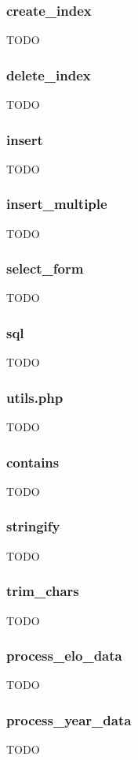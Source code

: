 \documentclass{article}
\begin{document}
\subsubsection*{create\_index}
TODO
\subsubsection*{delete\_index}
TODO
\subsubsection*{insert}
TODO
\subsubsection*{insert\_multiple}
TODO
\subsubsection*{select\_form}
TODO
\subsubsection*{sql}
TODO

\subsubsection{utils.php}
TODO

\subsubsection*{contains}
TODO

\subsubsection*{stringify}
TODO


\subsubsection*{trim\_chars}
TODO


\subsubsection*{process\_elo\_data}
TODO


\subsubsection*{process\_year\_data}
TODO
\end{document}
